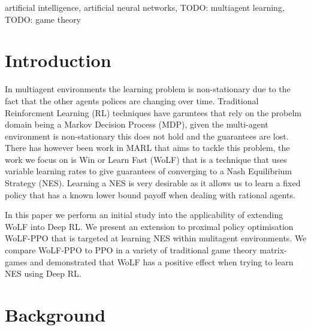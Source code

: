 \documentclass[conference]{IEEEtran}
\newcommand\TODO[1]{{\color{red}TODO: #1}}
\begin{document}
\begin{IEEEkeywords}
    artificial intelligence, artificial neural networks, \TODO{multiagent learning}, \TODO{game theory}
\end{IEEEkeywords}
\section{Introduction}

In multiagent environments the learning problem is non-stationary due to the fact that the other agents polices are changing over time. Traditional Reinforcment Learning (RL) techniques have garuntees that rely on the probelm domain being a Markov Decision Process (MDP), given the multi-agent environment is non-stationary this does not hold and the guarantees are lost. There has however been work in MARL that aims to tackle this problem, the work we focus on is Win or Learn Fast (WoLF) that is a technique that uses variable learning rates to give guarantees of converging to a Nash Equilibrium Strategy (NES). Learning a NES is very desirable as it allows us to learn a fixed policy that has a known lower bound payoff when dealing with rational agents.

In this paper we perform an initial study into the applicability of extending WoLF into Deep RL. We present an extension to proximal policy optimisation WoLF-PPO that is targeted at learning NES within mulitagent environments. We compare WoLF-PPO to PPO in a variety of traditional game theory matrix-games and demonstrated that WoLF has a positive effect when trying to learn NES using Deep RL.

\section{Background}

\end{document}
